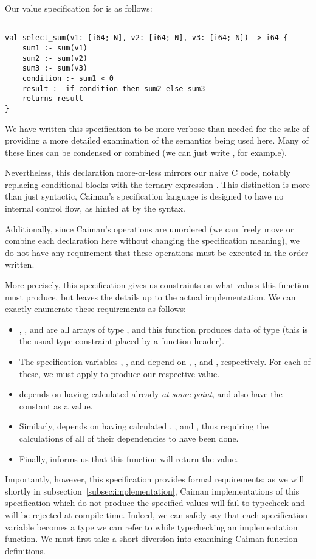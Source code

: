 Our value specification for  is as follows:
%
\begin{lstlisting}

val select_sum(v1: [i64; N], v2: [i64; N], v3: [i64; N]) -> i64 {
    sum1 :- sum(v1)
    sum2 :- sum(v2)
    sum3 :- sum(v3)
    condition :- sum1 < 0
    result :- if condition then sum2 else sum3
    returns result
}
\end{lstlisting}
%
We have written this specification to be more verbose than needed for the sake of providing a more detailed examination of the semantics being used here.  Many of these lines can be condensed or combined (we can just write , for example).

Nevertheless, this declaration more-or-less mirrors our naive C code, notably replacing conditional  blocks with the ternary expression .  This distinction is more than just syntactic, Caiman's specification language is designed to have no internal control flow, as hinted at by the syntax.

Additionally, since Caiman's operations are unordered (we can freely move or combine each declaration here without changing the specification meaning), we do not have any requirement that these operations must be executed in the order written.

More precisely, this specification gives us constraints on what values this function must produce, but leaves the details up to the actual implementation.  We can exactly enumerate these requirements as follows:
%
\begin{itemize}
\item {}, , and  are all arrays of type , and this function produces data of type  (this is the usual type constraint placed by a function header).
\item The specification variables , , and  depend on , , and , respectively.  For each of these, we must apply  to produce our respective value.
\item {} depends on having calculated  already \textit{at some point}, and also have the constant  as a value.
\item Similarly,  depends on having calculated , , and , thus requiring the calculations of all of their dependencies to have been done.
\item Finally,  informs us that this function will return the  value.
\end{itemize}
%
Importantly, however, this specification provides formal requirements; as we will shortly in subsection~\ref{subsec:implementation}, Caiman implementations of this specification which do not produce the specified values will fail to typecheck and will be rejected at compile time.  Indeed, we can safely say that each specification variable becomes a type we can refer to while typechecking an implementation function.  We must first take a short diversion into examining Caiman function definitions.

